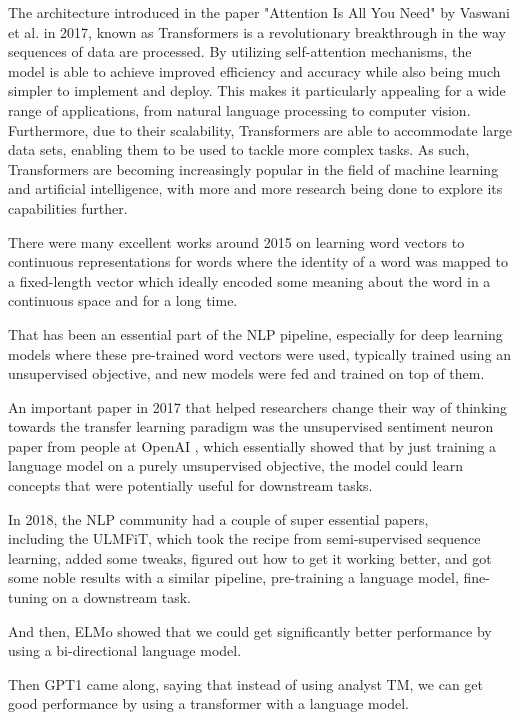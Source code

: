 The architecture introduced in the paper "Attention Is All You Need" by Vaswani et al. in 2017\cite{https://doi.org/10.48550/arxiv.1706.03762}, known as Transformers is a revolutionary breakthrough in the way sequences of data are processed. By utilizing self-attention mechanisms, the model is able to achieve improved efficiency and accuracy while also being much simpler to implement and deploy. This makes it particularly appealing for a wide range of applications, from natural language processing to computer vision. Furthermore, due to their scalability, Transformers are able to accommodate large data sets, enabling them to be used to tackle more complex tasks. As such, Transformers are becoming increasingly popular in the field of machine learning and artificial intelligence, with more and more research being done to explore its capabilities further.

There were many excellent works around 2015 on learning word vectors to continuous representations for words where the identity of a word was mapped to a fixed-length vector which ideally encoded some meaning about the word in a continuous space and for a long time.

That has been an essential part of the NLP pipeline, especially for deep learning models where these pre-trained word vectors were used, typically trained using an unsupervised objective, and new models were fed and trained on top of them.

An important paper in 2017 that helped researchers change their way of thinking towards the transfer learning paradigm was the unsupervised sentiment neuron paper from people at OpenAI \cite{DBLP:journals/corr/RadfordJS17}, which essentially showed that by just training a language model on a purely unsupervised objective, the model could learn concepts that were potentially useful for downstream tasks.

In 2018, the NLP community had a couple of super essential papers, \\
including the ULMFiT\cite{ELMo}, which took the recipe from semi-supervised sequence learning, added some tweaks, figured out how to get it working better, and got some noble results with a similar pipeline, pre-training a language model, fine-tuning on a downstream task.

And then, ELMo\cite{ELMo} showed that we could get significantly better performance by using a bi-directional language model.

Then GPT1 \cite{Radford2018ImprovingLU} came along, saying that instead of using analyst TM, we can get good performance by using a transformer with a language model.

